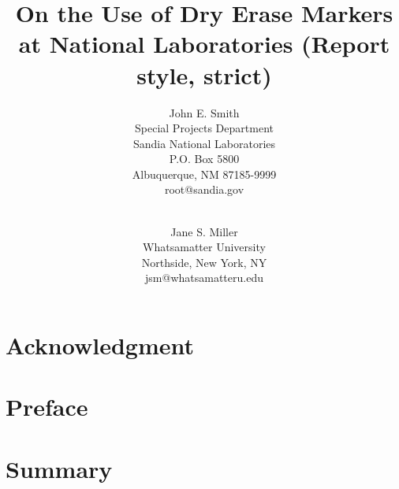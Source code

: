 \documentclass[pdf,ps2pdf,12pt,report,strict,blank]{SANDreport}
\title{On the Use of Dry Erase Markers at National Laboratories (Report style, strict)}
\author{John E. Smith \\
	  Special Projects Department \\
	  Sandia National Laboratories\\
	  P.O. Box 5800\\
	  Albuquerque, NM 87185-9999 \\
	  root@sandia.gov \\
	  \\
	  \and
	  Jane S. Miller \\
	  Whatsamatter University \\
	  Northside, New York, NY\\
	  jsm@whatsamatteru.edu
	 }
\date{}
\begin{document}
    \maketitle

    \begin{abstract}
	
    \end{abstract}


    \clearpage
    \chapter*{Acknowledgment}
	


    \cleardoublepage		%
    \tableofcontents
    \listoffigures
    \listoftables


    \clearpage
    \chapter*{Preface}
	


    \clearpage
    \chapter*{Summary}
	


    \clearpage
\end{document}
